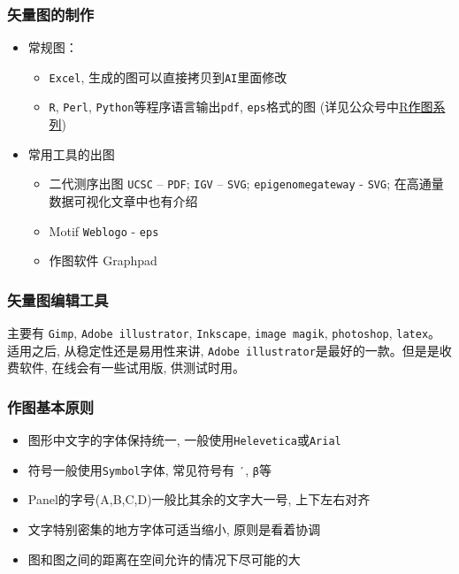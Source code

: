 \documentclass[]{article}
\providecommand{\tightlist}{%
  \setlength{\itemsep}{0pt}\setlength{\parskip}{0pt}}
\numberwithin{figure}{section}
\numberwithin{table}{section}
\theoremstyle{definition}
\theoremstyle{definition}
\theoremstyle{definition}
\theoremstyle{remark}
\begin{document}
\subsubsection{矢量图的制作}

\begin{itemize}
\tightlist
\item
  常规图：

  \begin{itemize}
  \tightlist
  \item
    \texttt{Excel}, 生成的图可以直接拷贝到\texttt{AI}里面修改
  \item
    \texttt{R}, \texttt{Perl},
    \texttt{Python}等程序语言输出\texttt{pdf}, \texttt{eps}格式的图
    (详见公众号中\href{http://mp.weixin.qq.com/s/zUS5dSa6cAQqR48XVJrt-g}{R作图系列})
  \end{itemize}
\item
  常用工具的出图

  \begin{itemize}
  \tightlist
  \item
    二代测序出图 \texttt{UCSC} -- \texttt{PDF}; \texttt{IGV} --
    \texttt{SVG}; \texttt{epigenomegateway} - \texttt{SVG};
    在高通量数据可视化文章中也有介绍
  \item
    Motif \texttt{Weblogo} - \texttt{eps}
  \item
    作图软件 Graphpad
  \end{itemize}
\end{itemize}

\subsubsection{矢量图编辑工具}

主要有 \texttt{Gimp}, \texttt{Adobe\ illustrator}, \texttt{Inkscape},
\texttt{image\ magik}, \texttt{photoshop}, \texttt{latex}。适用之后,
从稳定性还是易用性来讲,
\texttt{Adobe\ illustrator}是最好的一款。但是是收费软件,
在线会有一些试用版, 供测试时用。

\subsubsection{作图基本原则}

\begin{itemize}
\tightlist
\item
  图形中文字的字体保持统一, 一般使用\texttt{Helevetica}或\texttt{Arial}
\item
  符号一般使用\texttt{Symbol}字体, 常见符号有 \texttt{′}, \texttt{β}等
\item
  Panel的字号(A,B,C,D)一般比其余的文字大一号, 上下左右对齐
\item
  文字特别密集的地方字体可适当缩小, 原则是看着协调
\item
  图和图之间的距离在空间允许的情况下尽可能的大
\end{itemize}
\end{document}

